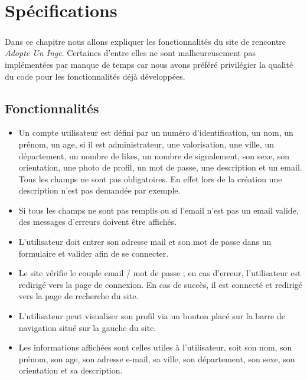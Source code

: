 \chapter{Spécifications}

\paragraph{}
Dans ce chapitre nous allons expliquer les fonctionnalités du site de rencontre \textit{Adopte Un Inge}. Certaines d'entre elles ne sont malheureusement pas implémentées par manque de temps car nous avons préféré privilégier la qualité du code pour les fonctionnalités déjà développées.
\section{Fonctionnalités}

\begin{itemize}
 \item Un compte utilisateur est défini par un numéro d'identification, un nom, un prénom, un age, si il est administrateur, une valorisation, une ville, un département, un nombre de likes, un nombre de signalement, son sexe, son orientation, une photo de profil, un mot de passe, une description et un email. Tous les champs ne sont pas obligatoires. En effet lors de la création une description n'est pas demandée par exemple.
 \item Si tous les champs ne sont pas remplis ou si l'email n'est pas un email valide, des messages d'erreurs doivent être affichés.
\end{itemize}

\begin{itemize}
 \item L'utilisateur doit entrer son adresse mail et son mot de passe dans un formulaire et valider afin de se connecter.
 \item Le site vérifie le couple email / mot de passe ; en cas d'erreur, l'utilisateur est redirigé vers la page de connexion.
 En cas de succès, il est connecté et redirigé vers la page de recherche du site.
\end{itemize}

\begin{itemize}
 \item L'utilisateur peut visualiser son profil via un bouton placé sur la barre de navigation situé sur la gauche du site.
 \item Les informations affichées sont celles utiles à l'utilisateur, soit son nom, son prénom, son age, son adresse e-mail, sa ville, son département, son sexe, son orientation et sa description.
\end{itemize}

